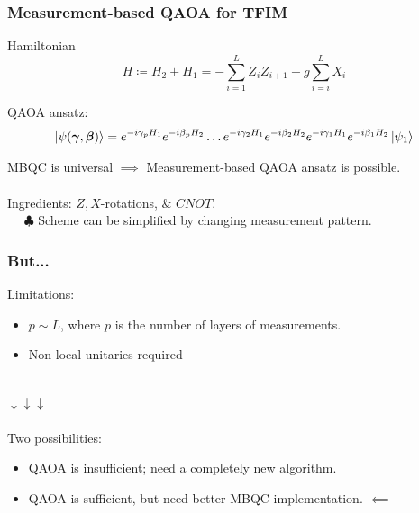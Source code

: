 \documentclass{beamer}
\theoremstyle{definition}
\begin{document}



\begin{frame}
\frametitle{Measurement-based QAOA for TFIM}

Hamiltonian
\begin{equation*}
H \coloneqq H_2 + H_1 =  - \sum_{i=1}^L Z_i Z_{i+1} - g\sum^L_{i=i}X_i
\end{equation*}


QAOA ansatz:
\begin{equation*}
\left\vert{\psi(\bm{\gamma}, \bm{\beta})}\right\rangle =  \strut {e^{-i\gamma_p H_1}e^{-i\beta_p H_2}} \dots {e^{-i\gamma_2 H_1}e^{-i\beta_2 H_2}} {e^{-i\gamma_1 H_1}e^{-i\beta_1 H_2}} \left\vert{\psi_1}\right\rangle
\end{equation*}

MBQC is universal $\implies$ Measurement-based QAOA ansatz is possible. \\

$\,$\\

Ingredients: $Z,X$-rotations, \& $CNOT$. \\

$\quad$ $\clubsuit$ Scheme can be simplified by changing measurement pattern.  

\end{frame}




\begin{frame}
\frametitle{But...}
Limitations: 
\begin{itemize}
	\item $p \sim L$, where $p$ is the number of layers of measurements. 
	\item Non-local unitaries required
\end{itemize}




$\,$\\
$\downarrow\downarrow\downarrow$\\

$\,$\\

Two possibilities:
\begin{itemize}
	\item QAOA is insufficient; need a completely new algorithm.
	\item QAOA is sufficient, but need better MBQC implementation. %
	$\impliedby$
\end{itemize} 



\end{frame}
\end{document}
